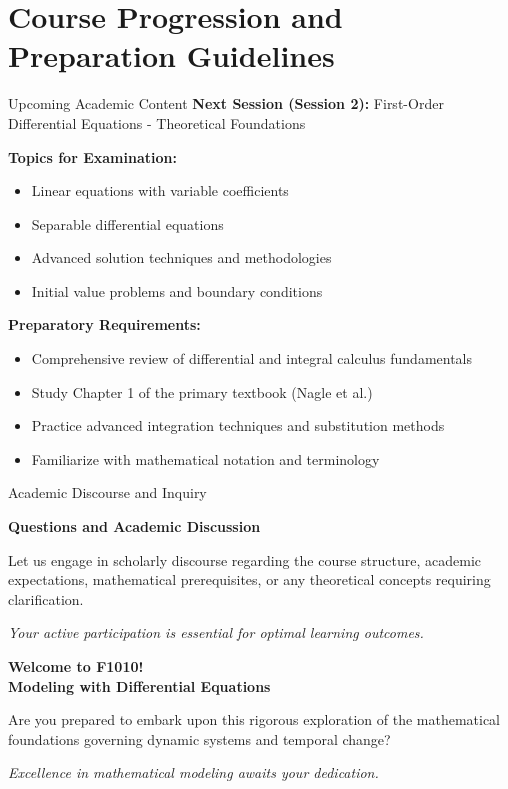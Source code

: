 \documentclass[10pt,aspectratio=169]{beamer}
\newcommand{\concept}[1]{\textbf{#1}}
\newcommand{\emphasis}[1]{\textit{#1}}
\begin{document}
\section{Course Progression and Preparation Guidelines}

\begin{frame}{Upcoming Academic Content}
    \concept{Next Session (Session 2):} First-Order Differential Equations - Theoretical Foundations
    
    
    \concept{Topics for Examination:}
    \begin{itemize}
        \item Linear equations with variable coefficients
        \item Separable differential equations
        \item Advanced solution techniques and methodologies
        \item Initial value problems and boundary conditions
    \end{itemize}
    
    
    \concept{Preparatory Requirements:}
    \begin{itemize}
        \item Comprehensive review of differential and integral calculus fundamentals
        \item Study Chapter 1 of the primary textbook (Nagle et al.)
        \item Practice advanced integration techniques and substitution methods
        \item Familiarize with mathematical notation and terminology
    \end{itemize}
\end{frame}

\begin{frame}{Academic Discourse and Inquiry}
    \begin{center}
        \Huge \textbf{Questions and Academic Discussion}
        
        
        \large Let us engage in scholarly discourse regarding the course structure, academic expectations, mathematical prerequisites, or any theoretical concepts requiring clarification.
        
        
        \emphasis{Your active participation is essential for optimal learning outcomes.}
    \end{center}
\end{frame}

\begin{frame}[standout]
    \concept{Welcome to F1010!}\\
    \textbf{Modeling with Differential Equations}
    
    
    \Large Are you prepared to embark upon this rigorous exploration of the mathematical foundations governing dynamic systems and temporal change?
    
    
    \emphasis{Excellence in mathematical modeling awaits your dedication.}
\end{frame}
\end{document}
